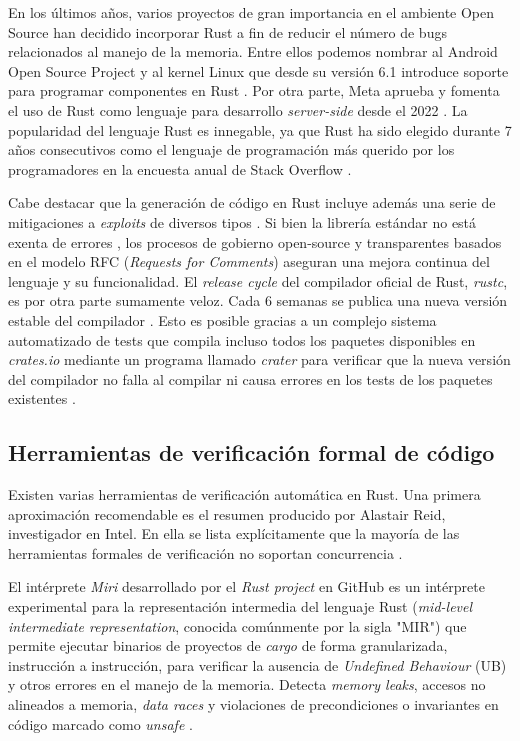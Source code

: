 \documentclass[12pt]{article}
\begin{document}
En los últimos años, varios proyectos de gran importancia en el ambiente Open Source han decidido incorporar Rust
a fin de reducir el número de bugs relacionados al manejo de la memoria.
Entre ellos podemos nombrar al Android Open Source Project \cite{android-rust} y
al kernel Linux que desde su versión 6.1 introduce soporte para programar componentes en Rust \cite{infoq-linux-6.1-rust, lwn-linux-6.1-rust}.
Por otra parte, Meta aprueba y fomenta el uso de Rust como lenguaje para desarrollo \textit{server-side} desde el 2022 \cite{meta-rust-server-side}.
La popularidad del lenguaje Rust es innegable, ya que Rust ha sido elegido durante 7 años consecutivos
como el lenguaje de programación más querido por los programadores en la encuesta anual de Stack Overflow \cite{so-survey2022}.

Cabe destacar que la generación de código en Rust incluye además una serie de mitigaciones a \textit{exploits} de diversos tipos \cite[Cap. 11]{rustc-book}.
Si bien la librería estándar no está exenta de errores \cite{davidoff2018},
los procesos de gobierno open-source y transparentes basados en el modelo RFC (\textit{Requests for Comments}) \cite{rust-rfcs}
aseguran una mejora continua del lenguaje y su funcionalidad.
El \textit{release cycle} del compilador oficial de Rust, \textit{rustc}, es por otra parte sumamente veloz.
Cada 6 semanas se publica una nueva versión estable del compilador \cite[Appendix G]{rust-book}.
Esto es posible gracias a un complejo sistema automatizado de tests que compila incluso todos los paquetes disponibles en \textit{crates.io}
mediante un programa llamado \textit{crater} para verificar que
la nueva versión del compilador no falla al compilar ni causa errores en los tests de los paquetes existentes \cite{albini2019}.

\subsection{Herramientas de verificación formal de código}

Existen varias herramientas de verificación automática en Rust.
Una primera aproximación recomendable es el resumen producido por Alastair Reid, investigador en Intel.
En ella se lista explícitamente que la mayoría de las herramientas formales de verificación no soportan concurrencia \cite{reid2021}.

El intérprete \textit{Miri} desarrollado por el \textit{Rust project} en GitHub es un intérprete experimental para la representación intermedia del lenguaje Rust
(\textit{mid-level intermediate representation}, conocida comúnmente por la sigla "MIR")
que permite ejecutar binarios de proyectos de \textit{cargo} de forma granularizada, instrucción a instrucción, para verificar la ausencia de \textit{Undefined Behaviour} (UB) y otros
errores en el manejo de la memoria.
Detecta \textit{memory leaks}, accesos no alineados a memoria, \textit{data races} y violaciones de precondiciones o invariantes en código marcado como \textit{unsafe} \cite{miri-website}.
\end{document}
